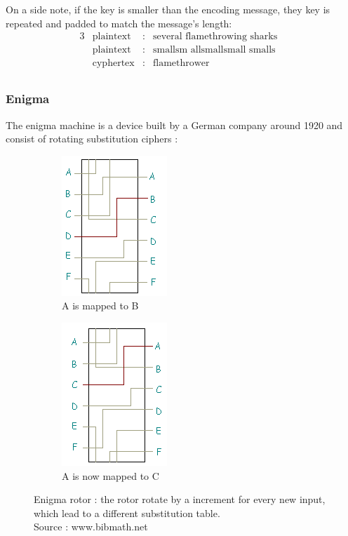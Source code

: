 On a side note, if the key is smaller than the encoding message, they key is repeated and padded to match the message's length:
\begin{alignat*}{3}
    &\text{plaintext}   & : & \text{several flamethrowing sharks}&  \\
    &\text{plaintext}   & : & \text{smallsm allsmallsmall smalls}&  \\
    &\text{cyphertex}   & : & \text{flamethrower}&  \\ 
\end{alignat*}


\subsubsection{Enigma}

The enigma machine is a device built by a German company around 1920 and consist of rotating substitution ciphers : 

\begin{figure}[ht!]
        \centering
        \begin{subfigure}[b]{0.4\textwidth}
                \centering
                \includegraphics{images/enigma_rotor1}
                \caption{A is mapped to B}
                \label{fig:enigma_rotor1}
        \end{subfigure}
        \begin{subfigure}[b]{0.4\textwidth}
                \centering
                \includegraphics{images/enigma_rotor2}
                \caption{A is now mapped to C}
                \label{fig:enigma_rotor2}
        \end{subfigure}
        \caption{Enigma rotor : the rotor rotate by a increment for every new input, which lead to a different substitution table. \\ Source : www.bibmath.net }\label{fig:enigma_rotors}
\end{figure}

